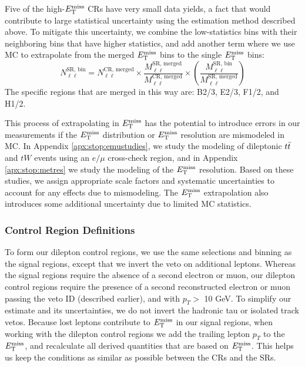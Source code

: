 Five of the high-$E_\text{T}^\text{miss}$ CRs have very small data yields, a fact that
would contribute to large statistical uncertainty using the
estimation method described above. To mitigate this uncertainty, we
combine the low-statistics bins with their neighboring bins that have
higher statistics, and add another term where we use MC to extrapolate
from the merged $E_\text{T}^\text{miss}$ bins to the single $E_\text{T}^\text{miss}$ bins:
\begin{equation}
\label{eq:stop:lostlep:metextrap}
N_{\ell\ell}^\text{SR, bin} = N_{\ell\ell}^\text{CR, merged} \times \frac{M_{\ell\ell}^\text{SR, merged}}{M_{\ell\ell}^\text{CR, merged}}
\times \left( \frac{M_{\ell\ell}^\text{SR, bin}}{M_{\ell\ell}^\text{SR, merged}} \right)
\end{equation}
The specific regions that are merged in this way are: B2/3, E2/3,
F1/2, and H1/2.

This process of extrapolating in $E_\text{T}^\text{miss}$ has the potential to introduce
errors in our measurements if the $E_\text{T}^\text{miss}$ distribution or $E_\text{T}^\text{miss}$ resolution
are mismodeled in MC. In Appendix \ref{apx:stop:emustudies}, we study
the modeling of dileptonic $t\bar{t}$ and $tW$ events using an $e/\mu$ cross-check
region, and in Appendix \ref{apx:stop:metres} we study the modeling of the
$E_\text{T}^\text{miss}$ resolution. Based on these studies, we assign appropriate scale
factors and systematic uncertainties to account for any effects due to
mismodeling. The $E_\text{T}^\text{miss}$ extrapolation also introduces some additional
uncertainty due to limited MC statistics.

\subsubsection{Control Region Definitions}
\label{sssec:stop:lostlep:crdefinitions}

To form our dilepton control regions, we use the same selections and
binning as the signal regions, except that we invert the veto on
additional leptons. Whereas the signal regions require the absence of
a second electron or muon, our dilepton control regions require the
presence of a second reconstructed electron or muon passing the
veto ID (described earlier), and with $p_T >$ 10 GeV. To simplify
our estimate and its uncertainties, we do not invert the
hadronic tau or isolated track vetos. Because lost leptons contribute
to $E_\text{T}^\text{miss}$ in our signal regions, when working with the dilepton
control regions we add the trailing lepton $p_T$ to the $E_\text{T}^\text{miss}$, and
recalculate all derived quantities that are based on $E_\text{T}^\text{miss}$. This
helps us keep the conditions as similar as possible between the CRs
and the SRs.


